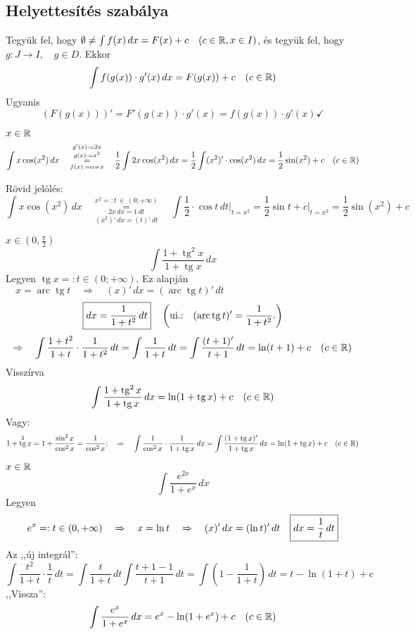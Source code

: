 \documentclass[a4paper,11.5pt]{article}
\DeclareMathOperator{\tg}{tg}
\DeclareMathOperator{\arc}{arc}
\begin{document}
	\subsection{Helyettesítés szabálya}
	\begin{revision}
		Tegyük fel, hogy $\emptyset\not=\int f(x)\,dx=F(x)+c\quad (c\in\mathbb{R}, x\in I)$, és tegyük fel, hogy\\ $g:J\to I, \quad g\in D.$ Ekkor
		\[ \int f(g(x))\cdot g'(x)\,dx=F(g(x))+c\quad (c\in\mathbb{R}) \]
		Ugyanis
		\[ (F(g(x)))'=F'(g(x))\cdot g'(x)=f(g(x))\cdot g'(x)\checkmark \]
	\end{revision}
	\begin{task}$x\in\mathbb{R}$
		\[ \int x\cos(x^2)\,dx\quad \overset{g'(x):=2x}{\overset{g(x):=x^2}{\underset{f(x):=\cos x}{=}}}\quad \frac{1}{2}\int 2x\cos(x^2)\,dx=\frac{1}{2}\int(x^2)'\cdot\cos(x^2)\,dx=\frac{1}{2}\sin(x^2)+c\quad (c\in\mathbb{R}) \]
	\end{task}
	\begin{note}
		Rövid jelölés: 
		\[ \int x\cos(x^2)\,dx\quad \overset{x^2=:t\,\in\,(0;+\infty)}{\underset{(x^2)'\,dx=(t)'\,dt}{\underset{2x\,dx=1\,dt}{=}}}\quad\int\frac{1}{2}\cdot\cos t\,dt\big|_{t=x^2}=\frac{1}{2}\sin t +c\big|_{t=x^2}=\frac{1}{2}\sin(x^2)+c  \]
	\end{note}
	\begin{task}$x\in(0,\frac{\pi}{2})$
		\[ \int\frac{1+\tg^2x}{1+\tg x}\,dx \]
		Legyen  \quad $\tg x=:t\in(0;+\infty).$ \quad Ez alapján $\quad  x=\arc\tg t\quad \Rightarrow\quad (x)'\,dx=(\arc\tg t)'\,dt$
		\[ \text{\fbox{$\displaystyle dx=\frac{1}{1+t^2}\,dt$}} \quad \left(\text{ui.:\quad }(\arc\tg t)'=\frac{1}{1+t^2}.\right)\]
		\[ \Rightarrow\quad \int\frac{1+t^2}{1+t}\cdot\frac{1}{1+t^2}\,dt=\int\frac{1}{1+t}\,dt=\int\frac{(t+1)'}{t+1}\,dt=\ln(t+1)+c\quad (c\in\mathbb{R}) \]
		Visszírva
		\[ \int\frac{1+\tg^2 x}{1+\tg x}\,dx=\ln(1+\tg x)+c\quad (c\in\R) \]
		Vagy:
		\[ 1+\tg^2 x=1+\frac{\sin^2x}{\cos^2x}=\frac{1}{\cos^2x};\quad \Rightarrow\quad \int\frac{1}{\cos^2x}\cdot\frac{1}{1+\tg x}\,dx=\int\frac{(1+\tg x)'}{1+\tg x}\,dx=\ln(1+\tg x)+c\quad (c\in\R) \]
	\end{task}
	\begin{task}$x\in\mathbb{R}$
		\[ \int\frac{e^{2x}}{1+e^x}\,dx \]
		Legyen \[e^x=:t\in(0,+\infty)\quad \Rightarrow\quad x=\ln t\quad \Rightarrow\quad (x)'\,dx=(\ln t)'\,dt\quad \text{\fbox{$\displaystyle dx=\frac{1}{t}\,dt$}} \]
		Az ,,új integrál'':\quad \[\displaystyle \int\frac{t^2}{1+t}\cdot\frac{1}{t}\,dt=\int\frac{t}{1+t}\,dt\int\frac{t+1-1}{t+1}\,dt=\int\left(1-\frac{1}{1+t}\right)\,dt=t-\ln(1+t)+c \]
		,,Vissza'':
		\[ \int\frac{e^x}{1+e^x}\,dx=e^x-\ln(1+e^x)+c\quad (c\in\mathbb{R}) \]
	\end{task}
\end{document}

